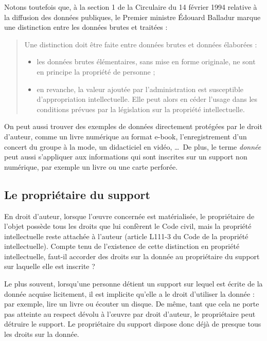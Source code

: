 Notons toutefois que, à la section 1 de la Circulaire du 14 février
1994 relative à la diffusion des données publiques, le Premier
ministre Édouard Balladur marque une distinction entre les données
brutes et traitées :

\begin{quotation}
  Une distinction doit être faite entre données brutes et données
  élaborées :
  \begin{itemize}
  \item les données brutes élémentaires, sans mise en forme
    originale, ne sont en principe la propriété de personne ;
  \item en revanche, la valeur ajoutée par l'administration est
    susceptible d'appropriation intellectuelle. Elle peut alors en
    céder l'usage dans les conditions prévues par la législation sur
    la propriété intellectuelle.
  \end{itemize}
\end{quotation}

On peut aussi trouver des exemples de données directement protégées
par le droit d'auteur, comme un livre numérique au format e-book,
l'enregistrement d'un concert du groupe à la mode, un didacticiel en
vidéo, \dots\ De plus, le terme \emph{donnée} peut aussi s'appliquer
aux informations qui sont inscrites sur un support non numérique, par
exemple un livre ou une carte perforée.

\subsection{Le propriétaire du support}

En droit d'auteur, lorsque l'œuvre concernée est matérialisée, le
propriétaire de l'objet possède tous les droits que lui confèrent le
Code civil, mais la propriété intellectuelle reste attachée à l'auteur
(article L111-3 du Code de la propriété intellectuelle). Compte tenu
de l'existence de cette distinction en propriété intellectuelle,
faut-il accorder des droits sur la donnée au propriétaire du support
sur laquelle elle est inscrite ?

Le plus souvent, lorsqu'une personne détient un support sur lequel est
écrite de la donnée acquise licitement, il est implicite qu'elle a le
droit d'utiliser la donnée : par exemple, lire un livre ou écouter un
disque. De même, tant que cela ne porte pas atteinte au respect dévolu
à l'œuvre par droit d'auteur, le propriétaire peut détruire le
support. Le propriétaire du support dispose donc déjà de presque tous
les droits sur la donnée.

